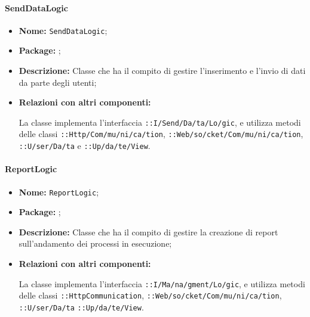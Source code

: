 \paragraph{SendDataLogic}
\begin{flushleft}
\begin{itemize}
\item \textbf{Nome:} \texttt{SendDataLogic};
\item \textbf{Package:} \texttt{\logicUser{}};
\item \textbf{Descrizione:} Classe che ha il compito di gestire l'inserimento e l'invio di dati da parte degli utenti;
\item \textbf{Relazioni con altri componenti:}
\begin{sloppypar}
La classe implementa l'interfaccia \texttt{\iLogicUser{}::I\fshyp{}Send\fshyp{}Da\fshyp{}ta\fshyp{}Lo\fshyp{}gic}, e utilizza metodi delle classi \texttt{\serverCommunication{}::Http\fshyp{}Com\fshyp{}mu\fshyp{}ni\fshyp{}ca\fshyp{}tion}, \texttt{\serverCommunication{}::Web\fshyp{}so\fshyp{}cket\fshyp{}Com\fshyp{}mu\fshyp{}ni\fshyp{}ca\fshyp{}tion}, \texttt{\model{}::U\fshyp{}ser\fshyp{}Da\fshyp{}ta} e \texttt{\viewUser{}::Up\fshyp{}da\fshyp{}te\fshyp{}View}.
\end{sloppypar}
\end{itemize}
\end{flushleft}

\paragraph{ReportLogic}
\begin{flushleft}
\begin{itemize}
\item \textbf{Nome:} \texttt{ReportLogic};
\item \textbf{Package:} \texttt{\logicUser{}};
\item \textbf{Descrizione:} Classe che ha il compito di gestire la creazione di report sull'andamento dei processi in esecuzione;
\item \textbf{Relazioni con altri componenti:}
\begin{sloppypar}
La classe implementa l'interfaccia \texttt{\iLogicUser{}::I\fshyp{}Ma\fshyp{}na\fshyp{}gment\fshyp{}Lo\fshyp{}gic}, e utilizza metodi delle classi \texttt{\serverCommunication{}::HttpCommunication}, \texttt{\serverCommunication{}::Web\fshyp{}so\fshyp{}cket\fshyp{}Com\fshyp{}mu\fshyp{}ni\fshyp{}ca\fshyp{}tion}, \texttt{\modelUser{}::U\fshyp{}ser\fshyp{}Da\fshyp{}ta} \texttt{\viewUser{}::Up\fshyp{}da\fshyp{}te\fshyp{}View}.
\end{sloppypar}
\end{itemize}
\end{flushleft}